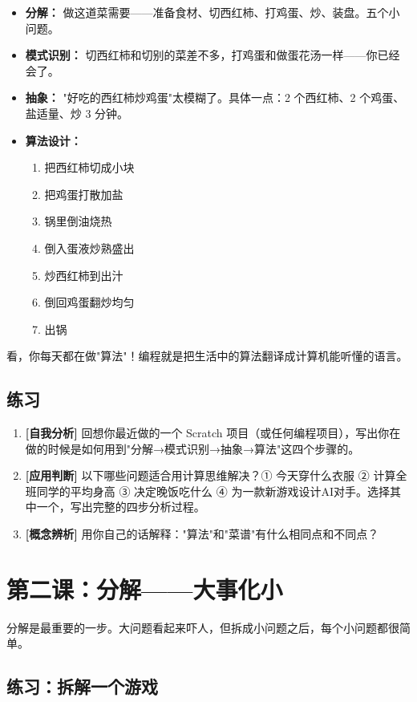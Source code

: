 \documentclass[a4paper,12pt]{ctexart}
\begin{document}
\begin{itemize}
  \item \textbf{分解：} 做这道菜需要——准备食材、切西红柿、打鸡蛋、炒、装盘。五个小问题。
  \item \textbf{模式识别：} 切西红柿和切别的菜差不多，打鸡蛋和做蛋花汤一样——你已经会了。
  \item \textbf{抽象：} "好吃的西红柿炒鸡蛋"太模糊了。具体一点：2 个西红柿、2 个鸡蛋、盐适量、炒 3 分钟。
  \item \textbf{算法设计：}
  \begin{enumerate}
    \item 把西红柿切成小块
    \item 把鸡蛋打散加盐
    \item 锅里倒油烧热
    \item 倒入蛋液炒熟盛出
    \item 炒西红柿到出汁
    \item 倒回鸡蛋翻炒均匀
    \item 出锅
  \end{enumerate}
\end{itemize}

看，你每天都在做"算法"！编程就是把生活中的算法翻译成计算机能听懂的语言。

\subsection*{练习}

\begin{enumerate}
  \item \textbf{[自我分析]} 回想你最近做的一个 Scratch 项目（或任何编程项目），写出你在做的时候是如何用到"分解→模式识别→抽象→算法"这四个步骤的。
  \item \textbf{[应用判断]} 以下哪些问题适合用计算思维解决？① 今天穿什么衣服 ② 计算全班同学的平均身高 ③ 决定晚饭吃什么 ④ 为一款新游戏设计AI对手。选择其中一个，写出完整的四步分析过程。
  \item \textbf{[概念辨析]} 用你自己的话解释："算法"和"菜谱"有什么相同点和不同点？
\end{enumerate}

\section*{第二课：分解——大事化小}

分解是最重要的一步。大问题看起来吓人，但拆成小问题之后，每个小问题都很简单。

\subsection*{练习：拆解一个游戏}
\end{document}
